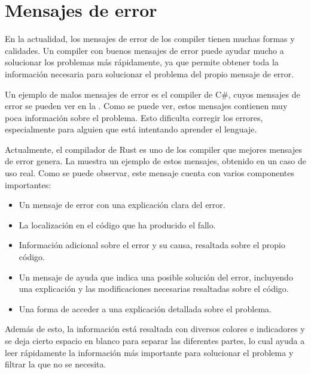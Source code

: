 \section{Mensajes de error}

En la actualidad, los mensajes de error de los \gls{compiler} tienen muchas
formas y calidades. Un \gls{compiler} con buenos mensajes de error puede ayudar
mucho a solucionar los problemas más rápidamente, ya que permite obtener toda la
información necesaria para solucionar el problema del propio mensaje de error.

Un ejemplo de malos mensajes de error es el \gls{compiler} de C\#, cuyos mensajes
de error se pueden ver en la . Como se puede ver, estos
mensajes contienen muy poca información sobre el problema. Esto dificulta
corregir los errores, especialmente para alguien que está intentando aprender el
lenguaje.


Actualmente, el compilador de Rust \parencite{Rust} es uno de los
compiler que mejores mensajes de error genera. La 
muestra un ejemplo de estos mensajes, obtenido en un caso de uso real. Como se
puede observar, este mensaje cuenta con varios componentes importantes:

\begin{itemize}
    \item Un mensaje de error con una explicación clara del error.
    \item La localización en el código que ha producido el fallo.
    \item Información adicional sobre el error y su causa, resaltada sobre el
    propio código.
    \item Un mensaje de ayuda que indica una posible solución del error,
    incluyendo una explicación y las modificaciones necesarias resaltadas sobre
    el código.
    \item Una forma de acceder a una explicación detallada sobre el problema.
\end{itemize}

Además de esto, la información está resaltada con diversos colores e indicadores
y se deja cierto espacio en blanco para separar las diferentes partes, lo cual
ayuda a leer rápidamente la información más importante para solucionar el
problema y filtrar la que no se necesita.


